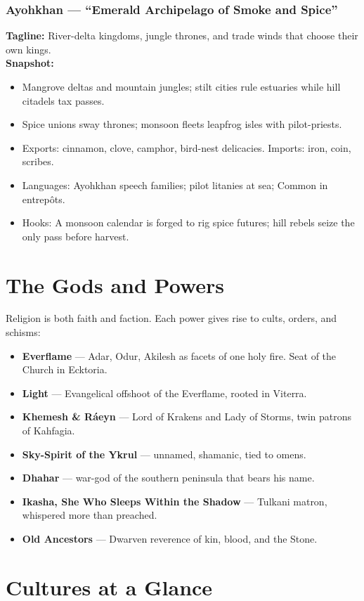 \documentclass[11pt]{book}
\begin{document}
\subsection*{Ayohkhan — “Emerald Archipelago of Smoke and Spice”}
\textbf{Tagline:} River-delta kingdoms, jungle thrones, and trade winds that choose their own kings.\\
\textbf{Snapshot:}
\begin{itemize}
  \item Mangrove deltas and mountain jungles; stilt cities rule estuaries while hill citadels tax passes.
  \item Spice unions sway thrones; monsoon fleets leapfrog isles with pilot-priests.
  \item Exports: cinnamon, clove, camphor, bird-nest delicacies. Imports: iron, coin, scribes.
  \item Languages: Ayohkhan speech families; pilot litanies at sea; Common in entrepôts.
  \item Hooks: A monsoon calendar is forged to rig spice futures; hill rebels seize the only pass before harvest.
\end{itemize}

\chapter{The Gods and Powers}
Religion is both faith and faction. Each power gives rise to cults, orders, and schisms:
\begin{itemize}
  \item \textbf{Everflame} — Adar, Odur, Akilesh as facets of one holy fire. Seat of the Church in Ecktoria.  
  \item \textbf{Light} — Evangelical offshoot of the Everflame, rooted in Viterra.  
  \item \textbf{Khemesh \& Ráeyn} — Lord of Krakens and Lady of Storms, twin patrons of Kahfagia.  
  \item \textbf{Sky-Spirit of the Ykrul} — unnamed, shamanic, tied to omens.  
  \item \textbf{Dhahar} — war-god of the southern peninsula that bears his name.  
  \item \textbf{Ikasha, She Who Sleeps Within the Shadow} — Tulkani matron, whispered more than preached.  
  \item \textbf{Old Ancestors} — Dwarven reverence of kin, blood, and the Stone.  
\end{itemize}

\chapter{Cultures at a Glance}
\end{document}
